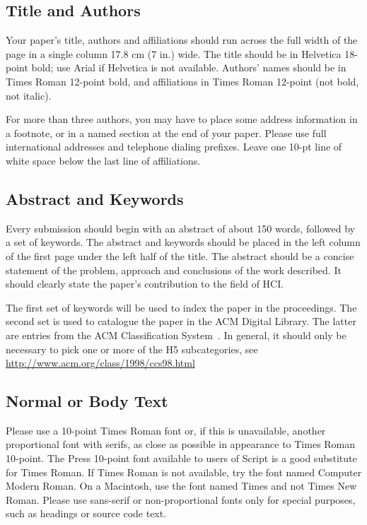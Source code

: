 \documentclass{sigchi}
\begin{document}
\subsection{Title and Authors}

Your paper's title, authors and affiliations should run across the
full width of the page in a single column 17.8 cm (7 in.) wide.  The
title should be in Helvetica 18-point bold; use Arial if Helvetica is
not available.  Authors' names should be in Times Roman 12-point bold,
and affiliations in Times Roman 12-point (not bold, not italic).  

For more than three authors,
you may have to place some address information in a footnote, or in a named
section at the end of your paper. Please use full international addresses and
telephone dialing prefixes.  Leave one 10-pt line of white space below the last
line of affiliations.

\subsection{Abstract and Keywords}

Every submission should begin with an abstract of about 150 words,
followed by a set of keywords. The abstract and keywords should be
placed in the left column of the first page under the left half of the
title. The abstract should be a concise statement of the problem,
approach and conclusions of the work described.  It should clearly
state the paper's contribution to the field of HCI.

The first set of keywords will be used to index the paper in the
proceedings. The second set is used to catalogue the paper in the ACM
Digital Library. The latter are entries from the ACM Classification
System~\cite{acm_categories}.  In general, it should only be necessary
to pick one or more of the H5 subcategories, see
\url{http://www.acm.org/class/1998/ccs98.html}

\subsection{Normal or Body Text}

Please use a 10-point Times Roman font or, if this is unavailable,
another proportional font with serifs, as close as possible in
appearance to Times Roman 10-point. The Press 10-point font available
to users of Script is a good substitute for Times Roman. If Times
Roman is not available, try the font named Computer Modern Roman. On a
Macintosh, use the font named Times and not Times New Roman. Please
use sans-serif or non-proportional fonts only for special purposes,
such as headings or source code text.
\end{document}
